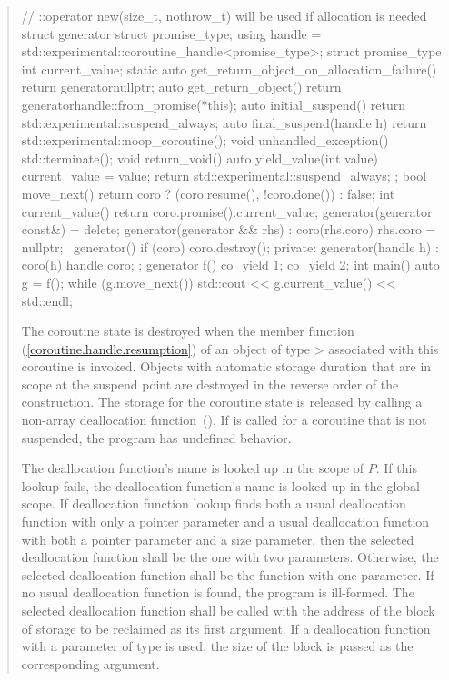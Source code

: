 \begin{quote}
\begin{codeblock}
// ::operator new(size_t, nothrow_t) will be used if allocation is needed
struct generator {
  struct promise_type;
  using handle = std::experimental::coroutine_handle<promise_type>;
  struct promise_type {
    int current_value;
    static auto get_return_object_on_allocation_failure() { return generator{nullptr}; }
    auto get_return_object() { return generator{handle::from_promise(*this)}; }
    auto initial_suspend() { return std::experimental::suspend_always{}; }
    auto final_suspend(handle h) { return std::experimental::noop_coroutine(); }
    void unhandled_exception() { std::terminate(); }
    void return_void() {}
    auto yield_value(int value) {
      current_value = value;
      return std::experimental::suspend_always{};
    }
  };
  bool move_next() { return coro ? (coro.resume(), !coro.done()) : false; }
  int current_value() { return coro.promise().current_value; }
  generator(generator const&) = delete;
  generator(generator && rhs) : coro(rhs.coro) { rhs.coro = nullptr; }
  ~generator() { if (coro) coro.destroy(); }
private:
  generator(handle h) : coro(h) {}
  handle coro;
};
generator f() { co_yield 1; co_yield 2; }
int main() {
  auto g = f();
  while (g.move_next()) std::cout << g.current_value() << std::endl;
}
\end{codeblock}
\exitexample

\pnum
The coroutine state is destroyed when the  member function (\ref{coroutine.handle.resumption})
of an object of type > associated with this coroutine is invoked.
Objects with automatic storage duration that are in scope at the suspend point are destroyed in the reverse order of the construction.
The storage for the coroutine state is released by calling a non-array deallocation function~().
If  is called for a coroutine that is not suspended, the program has undefined behavior.

\pnum
The deallocation function's name is looked up in the scope of $P$. If this lookup fails, the deallocation function's name is looked up in the global scope. If deallocation function lookup finds both a usual deallocation function with only a pointer parameter and a usual deallocation function with both a pointer parameter and a size parameter, then the selected deallocation function shall be the one with two parameters. Otherwise, the selected deallocation function shall be the function with one parameter. If no usual deallocation function is found, the program is ill-formed.
The selected deallocation function shall be called with the address of the block of storage to be reclaimed as its first argument. If a deallocation function with a parameter of type  is used, the size of the block is passed as the corresponding argument.


\end{quote}
